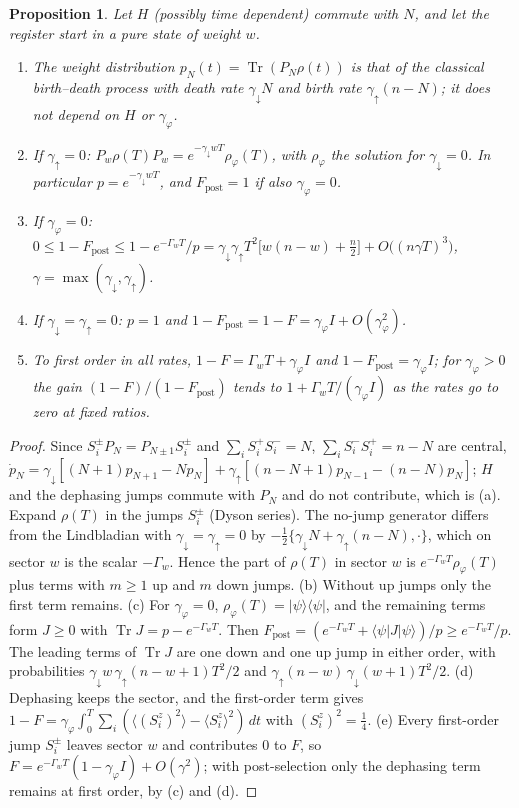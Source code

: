 \documentclass[11pt]{article}
\DeclareMathOperator{\Tr}{Tr}
\newtheorem{proposition}{Proposition}
\begin{document}
\begin{proposition}\label{prop:noisy}
Let $H$ (possibly time dependent) commute with $N$, and let the register start in a pure state of weight $w$.
\begin{enumerate}
\item[(a)] The weight distribution $p_N(t)=\Tr(P_N\rho(t))$ is that of the classical birth--death process with death rate
$\gamma_\downarrow N$ and birth rate $\gamma_\uparrow(n-N)$; it does not depend on $H$ or $\gamma_\varphi$.
\item[(b)] If $\gamma_\uparrow=0$: $P_w\rho(T)P_w=e^{-\gamma_\downarrow wT}\rho_\varphi(T)$, with $\rho_\varphi$ the
solution for $\gamma_\downarrow=0$. In particular $p=e^{-\gamma_\downarrow wT}$, and $F_{\mathrm{post}}=1$ if also
$\gamma_\varphi=0$.
\item[(c)] If $\gamma_\varphi=0$: $0\le1-F_{\mathrm{post}}\le1-e^{-\Gamma_wT}/p
=\gamma_\downarrow\gamma_\uparrow T^2\bigl[w(n-w)+\tfrac n2\bigr]+O\bigl((n\gamma T)^3\bigr)$,
$\gamma=\max(\gamma_\downarrow,\gamma_\uparrow)$.
\item[(d)] If $\gamma_\downarrow=\gamma_\uparrow=0$: $p=1$ and $1-F_{\mathrm{post}}=1-F=\gamma_\varphi
I+O(\gamma_\varphi^2)$.
\item[(e)] To first order in all rates, $1-F=\Gamma_wT+\gamma_\varphi I$ and $1-F_{\mathrm{post}}=\gamma_\varphi I$; for
$\gamma_\varphi>0$ the gain $(1-F)/(1-F_{\mathrm{post}})$ tends to $1+\Gamma_wT/(\gamma_\varphi I)$ as the rates go to
zero at fixed ratios.
\end{enumerate}
\end{proposition}
\begin{proof}
Since $S^\pm_iP_N=P_{N\pm1}S^\pm_i$ and $\sum_iS^+_iS^-_i=N$, $\sum_iS^-_iS^+_i=n-N$ are central, $\dot p_N=
\gamma_\downarrow[(N+1)p_{N+1}-Np_N]+\gamma_\uparrow[(n-N+1)p_{N-1}-(n-N)p_N]$; $H$ and the dephasing jumps commute
with $P_N$ and do not contribute, which is (a). Expand $\rho(T)$ in the jumps $S^\pm_i$ (Dyson series). The no-jump
generator differs from the Lindbladian with $\gamma_\downarrow=\gamma_\uparrow=0$ by
$-\frac12\{\gamma_\downarrow N+\gamma_\uparrow(n-N),\cdot\}$, which on sector $w$ is the scalar $-\Gamma_w$. Hence the
part of $\rho(T)$ in sector $w$ is $e^{-\Gamma_wT}\rho_\varphi(T)$ plus terms with $m\ge1$ up and $m$ down jumps. (b)
Without up jumps only the first term remains. (c) For $\gamma_\varphi=0$, $\rho_\varphi(T)=|\psi\rangle\langle\psi|$,
and the remaining terms form $J\ge0$ with $\Tr J=p-e^{-\Gamma_wT}$. Then $F_{\mathrm{post}}=(e^{-\Gamma_wT}+\langle\psi|
J|\psi\rangle)/p\ge e^{-\Gamma_wT}/p$. The leading terms of $\Tr J$ are one down and one up jump in either order, with
probabilities $\gamma_\downarrow w\,\gamma_\uparrow(n-w+1)T^2/2$ and $\gamma_\uparrow(n-w)\,\gamma_\downarrow(w+1)T^2/2$.
(d) Dephasing keeps the sector, and the first-order term gives $1-F=\gamma_\varphi\int_0^T\sum_i(\langle(S^z_i)^2\rangle
-\langle S^z_i\rangle^2)\,dt$ with $(S^z_i)^2=\frac14$. (e) Every first-order jump $S^\pm_i$ leaves sector $w$ and
contributes $0$ to $F$, so $F=e^{-\Gamma_wT}(1-\gamma_\varphi I)+O(\gamma^2)$; with post-selection only the dephasing
term remains at first order, by (c) and (d).
\end{proof}
\end{document}
